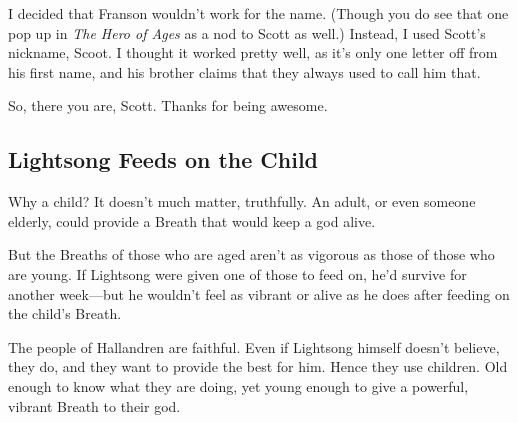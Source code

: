 I decided that Franson wouldn’t work for the name. (Though you do see that one pop up in \textit{The Hero of Ages} as a nod to Scott as well.) Instead, I used Scott’s nickname, Scoot. I thought it worked pretty well, as it’s only one letter off from his first name, and his brother claims that they always used to call him that.

So, there you are, Scott. Thanks for being awesome.

\subsection*{Lightsong Feeds on the Child}

Why a child? It doesn’t much matter, truthfully. An adult, or even someone elderly, could provide a Breath that would keep a god alive.

But the Breaths of those who are aged aren’t as vigorous as those of those who are young. If Lightsong were given one of those to feed on, he’d survive for another week—but he wouldn’t feel as vibrant or alive as he does after feeding on the child’s Breath.

The people of Hallandren are faithful. Even if Lightsong himself doesn’t believe, they do, and they want to provide the best for him. Hence they use children. Old enough to know what they are doing, yet young enough to give a powerful, vibrant Breath to their god.




